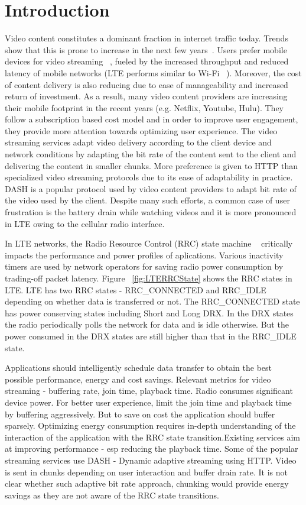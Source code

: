 \section{Introduction}
Video content constitutes a dominant fraction in internet traffic today. Trends show that this is prone to increase in the next few years~\cite{}.
Users prefer mobile devices for video streaming ~\cite{}, fueled by the increased throughput and reduced latency of mobile networks (LTE performs similar to Wi-Fi ~\cite{LTEPaper}).
Moreover, the cost of content delivery is also reducing due to ease of manageability and increased return of investment. As a result, many video content providers are increasing their mobile footprint in the recent years (e.g. Netflix, Youtube, Hulu). 
They follow a subscription based cost model and in order to improve user engagement, they provide more attention towards optimizing user experience. The video streaming services adapt video delivery according to the client device and network conditions by adapting the bit rate of the content sent to the client and delivering the content in smaller chunks. 
More preference is given to HTTP than specialized video streaming protocols due to its ease of adaptability in practice.  
DASH is a popular protocol used by video content providers to adapt bit rate of the video used by the client. Despite many such efforts, a common case of user frustration is the battery drain while watching videos and it is more pronounced in LTE owing to the cellular radio interface. 
 
In LTE networks, the Radio Resource Control (RRC) state machine ~\cite{LTEPaper} critically impacts the performance and power profiles of aplications. Various inactivity timers are used by network operators for saving radio power consumption by trading-off packet latency. Figure ~\ref{fig:LTERRCState} shows the RRC states in LTE. LTE has two RRC states - RRC\_CONNECTED and RRC\_IDLE depending on whether data is transferred or not. The RRC\_CONNECTED state has power conserving states including Short and Long DRX. In the DRX states the radio periodically polls the network for data and is idle otherwise. But the power consumed in the DRX states are still higher than that in the RRC\_IDLE state. 


Applications should intelligently schedule data transfer to obtain the best possible performance, energy and cost savings. Relevant metrics for video streaming - buffering rate, join time, playback time. Radio consumes significant device power. For better user experience, limit the join time and playback time by buffering aggressively. But to save on cost the application should buffer sparsely. Optimizing energy consumption requires in-depth understanding of the interaction of the application with the RRC state transition.Existing services aim at improving performance - esp reducing the playback time. Some of the popular streaming services use DASH - Dynamic adaptive streaming using HTTP. Video is sent in chunks depending on user interaction and buffer drain rate. It is not clear whether such adaptive bit rate approach, chunking would provide energy savings as they are not aware of the RRC state transitions.           


